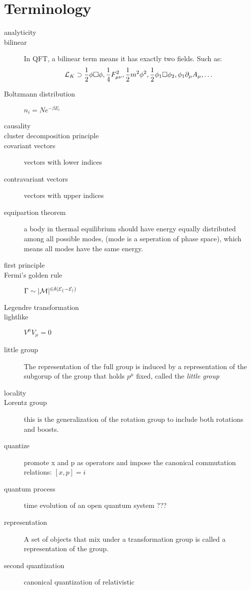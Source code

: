 \chapter{Terminology}
\begin{description}
    \item [analyticity]
    \item [bilinear]	In QFT, a bilinear term means it has exactly two
	fields. Such as:
	\[ \mathcal{L}_K \supset \frac{1}{2}\phi\Box\phi,
	\frac{1}{4}F^2_{\mu\nu}, \frac{1}{2}m^2\phi^2,
	\frac{1}{2}\phi_1\Box\phi_2, \phi_1\partial_\mu A_\mu, \dots \]
    \item [Boltzmann distribution]  $n_{i} = Ne^{-\beta E_{i}}$
    \item [causality]
    \item [cluster decomposition principle]
    \item [covariant vectors]	vectors with lower indices
    \item [contravariant vectors]   vectors with upper indices
    \item [equipartion theorem] a body in thermal equilibrium should have
	energy equally distributed among all possible modes, (mode is a
	seperation of phase space), which means all modes have the same
	energy.
    \item [first principle]
    \item [Fermi's golden rule]	$\Gamma \sim |\cal{M}|^{2\delta(E_f - E_i)}$
    \item [Legendre transformation]
    \item [lightlike]	$V^\mu V_\mu = 0$
    \item [little group] The representation of the full \Poincare{}
	group is induced by a representation of the subgorup of the
	\Poincare{} group that holds $p^\mu$ fixed, called the
	\emph{little group}
    \item [locality]
    \item [Lorentz group] this is the generalization of the rotation group
	to include both rotations and boosts.
    \item [quantize]	promote x and p as operators and impose the
	canonical commutation relations:    $[x, p] = i$
    \item [quantum process]  time evolution of an open quantum system ???
    \item [representation] A set of objects that mix under a transformation
	group is called a representation of the group. 
    \item [second quantization]	canonical quantization of relativistic

\end{description}
